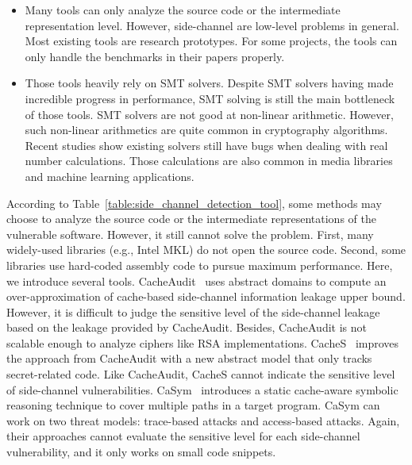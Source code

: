 \begin{itemize}
    \item Many tools can only analyze the source code or the intermediate representation level. However, side-channel are low-level problems in general.  Most existing tools are research prototypes. For some projects, the tools can only handle the benchmarks in their papers properly. 
    \item Those tools heavily rely on SMT solvers. Despite SMT solvers having made incredible progress in performance, SMT solving is still the main bottleneck of those tools. SMT solvers are not good at non-linear arithmetic. However, such non-linear arithmetics are quite common in cryptography algorithms.  Recent studies show existing solvers still have bugs when dealing with real number calculations. Those calculations are also common in media libraries and machine learning applications.
\end{itemize}

According to Table~\ref{table:side_channel_detection_tool}, some methods may choose to analyze the source code or the intermediate representations of the vulnerable software. However, it still cannot solve the problem. First, many widely-used libraries (e.g., Intel MKL) do not open the source code. Second, some libraries use hard-coded assembly code to pursue maximum performance.
Here, we introduce several tools. CacheAudit~\cite{182946} uses abstract domains to compute an
over-approximation of cache-based side-channel information leakage upper bound.
However, it is difficult to judge the sensitive level of the side-channel leakage based on the leakage provided by CacheAudit. Besides, CacheAudit is not scalable enough to analyze ciphers like RSA implementations. CacheS~\cite{236338} improves the approach from
CacheAudit with a new abstract model that only tracks
secret-related code. Like CacheAudit, CacheS cannot
indicate the sensitive level of side-channel vulnerabilities.
CaSym~\cite{Brotzman19Casym} introduces a static cache-aware symbolic reasoning technique to cover multiple paths in a target program. CaSym can work on two threat models: trace-based attacks and access-based attacks. Again, their
approaches cannot evaluate the sensitive level for each side-channel vulnerability, and it only works on small code snippets.

